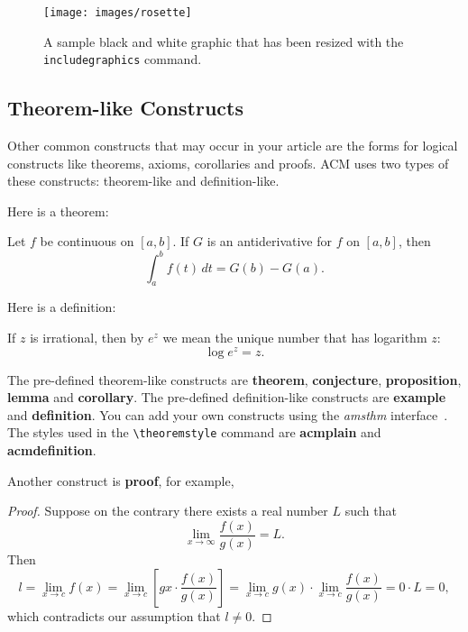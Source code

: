 \documentclass[sigconf]{acmart}
\begin{document}
\begin{figure}
\texttt{[image: images/rosette]}
\caption{A sample black and white graphic that has
been resized with the \texttt{includegraphics} command.}
\end{figure}

\subsection{Theorem-like Constructs}

Other common constructs that may occur in your article are the forms
for logical constructs like theorems, axioms, corollaries and proofs.
ACM uses two types of these constructs:  theorem-like and
definition-like.

Here is a theorem:

\begin{theorem}
  Let $f$ be continuous on $[a,b]$.  If $G$ is
  an antiderivative for $f$ on $[a,b]$, then
  \begin{displaymath}
    \int^b_af(t)\,dt = G(b) - G(a).
  \end{displaymath}
\end{theorem}

Here is a definition:

\begin{definition}
  If $z$ is irrational, then by $e^z$ we mean the
  unique number that has
  logarithm $z$:
  \begin{displaymath}
    \log e^z = z.
  \end{displaymath}
\end{definition}

The pre-defined theorem-like constructs are \textbf{theorem},
\textbf{conjecture}, \textbf{proposition}, \textbf{lemma} and
\textbf{corollary}.  The pre-defined de\-fi\-ni\-ti\-on-like
constructs are \textbf{example} and \textbf{definition}.  You can add
your own constructs using the \textsl{amsthm}
interface~\cite{Amsthm15}.  The styles used in the
\verb|\theoremstyle| command are \textbf{acmplain} and
\textbf{acmdefinition}.

Another construct is \textbf{proof}, for example,

\begin{proof}
  Suppose on the contrary there exists a real number $L$ such that
  \begin{displaymath}
    \lim_{x\rightarrow\infty} \frac{f(x)}{g(x)} = L.
  \end{displaymath}
  Then
  \begin{displaymath}
    l=\lim_{x\rightarrow c} f(x)
    = \lim_{x\rightarrow c}
    \left[ g{x} \cdot \frac{f(x)}{g(x)} \right ]
    = \lim_{x\rightarrow c} g(x) \cdot \lim_{x\rightarrow c}
    \frac{f(x)}{g(x)} = 0\cdot L = 0,
  \end{displaymath}
  which contradicts our assumption that $l\neq 0$.
\end{proof}
\end{document}
